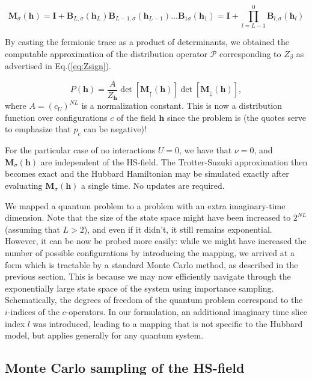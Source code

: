 \begin{equation}
\bm M_\sigma (\bm h) = \bm I + \bm B_{L,\sigma} ( \bm h_L) \bm B_{L-1,\sigma} ( \bm h_{L-1}) ... \bm B_{1\sigma} ( \bm h_1) = \bm I + \prod_{l= L -1}^0 \bm B_{l,\sigma} ( \bm h_l )
\end{equation}

By casting the fermionic trace as a product of determinants, we obtained the computable approximation of the distribution operator $\mathcal{P}$ corresponding to $Z_{\beta}$ as advertised in Eq.(\ref{eq:Zsign}).

\begin{equation}
P(\bm h) = \frac{A}{Z_{\bm h}} \det [ \bm M_{\uparrow}(\bm h) ] \det [ \bm M_{\downarrow}(\bm h) ] ,
\end{equation}
where $A = (c_U)^{NL}$ is a normalization constant.
This is now a distribution function over configurations $c$ of the field $\bm h$ since the problem is  (the quotes serve to emphasize that $p_c$ can be negative)!

For the particular case of no interactions $U = 0$, we have that $\nu = 0$, and $\bm M_\sigma (\bm h)$ are independent of the HS-field. 
The Trotter-Suzuki approximation then becomes exact and the Hubbard Hamiltonian may be simulated exactly after evaluating $\bm M_\sigma (\bm h)$ a single time.
No updates are required.

We mapped a quantum problem to a  problem with an extra imaginary-time dimension.
Note that the size of the state space might have been increased to $2^{NL}$ (assuming that $L > 2$), and even if it didn't, it still remains exponential.
However, it can be now be probed more easily: while we might have increased the number of possible configurations by introducing the mapping, we arrived at a form which is tractable by a standard Monte Carlo method, as described in the previous section.
This is because we may now efficiently navigate through the exponentially large state space of the system using importance sampling.
Schematically, the degrees of freedom of the quantum problem correspond to the $i$-indices of the $c$-operators.
In our formulation, an additional imaginary time slice index $l$ was introduced, leading to a mapping that is not specific to the Hubbard model, but applies generally for any quantum system.

\subsection{Monte Carlo sampling of the HS-field}
\label{subsec:mc_hs}


